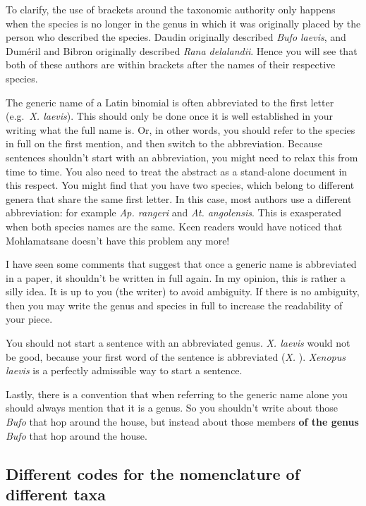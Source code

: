 \documentclass[
]{krantz}
\begin{document}
To clarify, the use of brackets around the taxonomic authority only happens when the species is no longer in the genus in which it was originally placed by the person who described the species. Daudin \citeyearpar{daudin1802histoire} originally described \emph{Bufo laevis}, and Duméril and Bibron \citeyearpar{dumeril1841erpetologie} originally described \emph{Rana delalandii}. Hence you will see that both of these authors are within brackets after the names of their respective species.

The generic name of a Latin binomial is often abbreviated to the first letter (e.g.~\emph{X. laevis}). This should only be done once it is well established in your writing what the full name is. Or, in other words, you should refer to the species in full on the first mention, and then switch to the abbreviation. Because sentences shouldn't start with an abbreviation, you might need to relax this from time to time. You also need to treat the abstract as a stand-alone document in this respect. You might find that you have two species, which belong to different genera that share the same first letter. In this case, most authors use a different abbreviation: for example \emph{Ap. rangeri} and \emph{At. angolensis}. This is exasperated when both species names are the same. Keen readers would have noticed that Mohlamatsane doesn't have this problem any more!

I have seen some comments that suggest that once a generic name is abbreviated in a paper, it shouldn't be written in full again. In my opinion, this is rather a silly idea. It is up to you (the writer) to avoid ambiguity. If there is no ambiguity, then you may write the genus and species in full to increase the readability of your piece.

You should not start a sentence with an abbreviated genus. \emph{X. laevis} would not be good, because your first word of the sentence is abbreviated (\emph{X.} ). \emph{Xenopus laevis} is a perfectly admissible way to start a sentence.

Lastly, there is a convention that when referring to the generic name alone you should always mention that it is a genus. So you shouldn't write about those \emph{Bufo} that hop around the house, but instead about those members \textbf{of the genus} \emph{Bufo} that hop around the house.

\hypertarget{different-codes-for-the-nomenclature-of-different-taxa}{%
\subsection{Different codes for the nomenclature of different taxa}\label{different-codes-for-the-nomenclature-of-different-taxa}}
\end{document}
